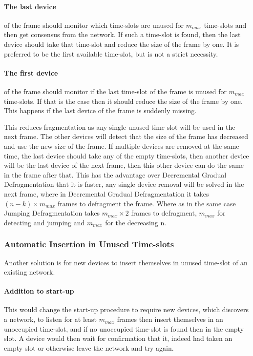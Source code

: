 \paragraph{The last device} of the frame should monitor which time-slots are unused for $m_{max}$ time-slots and then get consensus from the network. 
If such a time-slot is found, then the last device should take that time-slot and reduce the size of the frame by one. 
It is preferred to be the first available time-slot, but is not a strict necessity.   

\paragraph{The first device} of the frame should monitor if the last time-slot of the frame is unused for $m_{max}$ time-slots.
If that is the case then it should reduce the size of the frame by one.
This happens if the last device of the frame is suddenly missing.


\bigskip \noindent
This reduces fragmentation as any single unused time-slot will be used in the next frame.
The other devices will detect that the size of the frame has decreased and use the new size of the frame. 
If multiple devices are removed at the same time, the last device should take any of the empty time-slots, then another device will be the last device of the next frame, then this other device can do the same in the frame after that. 
This has the advantage over Decremental Gradual Defragmentation that it is faster, any single device removal will be solved in the next frame, where in Decremental Gradual Defragmentation it takes $(n - k) \times m_{max}$ frames to defragment the frame. 
Where as in the same case Jumping Defragmentation takes $m_{max} \times 2$ frames to defragment, $m_{max}$ for detecting and jumping and $m_{max}$ for the decreasing n. 

\subsubsection{Automatic Insertion in Unused Time-slots}
Another solution is for new devices to insert themselves in unused time-slot of an existing network.

\paragraph{Addition to start-up}
This would change the start-up procedure to require new devices, which discovers a network, to listen for at least $m_{max}$ frames then insert themselves in an unoccupied time-slot, and if no unoccupied time-slot is found then in the empty slot.
A device would then wait for confirmation that it, indeed had taken an empty slot or otherwise leave the network and try again.

